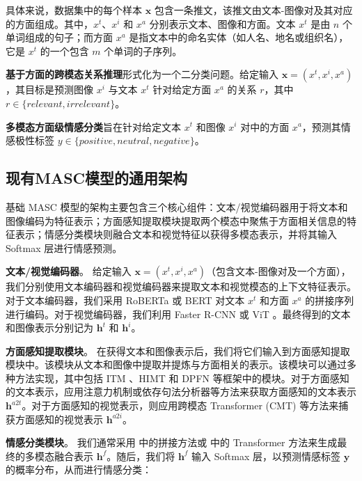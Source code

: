 具体来说，数据集中的每个样本 $\mathbf{x}$ 包含一条推文，该推文由文本-图像对及其对应的方面组成。其中，$x^t$、$x^i$ 和 $x^a$ 分别表示文本、图像和方面。文本 $x^t$ 是由 $n$ 个单词组成的句子；而方面 $x^a$ 是指文本中的命名实体（如人名、地名或组织名），它是 $x^t$ 的一个包含 $m$ 个单词的子序列。

\textbf{基于方面的跨模态关系推理}形式化为一个二分类问题。给定输入 $\mathbf{x} = (x^t, x^i, x^a)$，其目标是预测图像 $x^i$ 与文本 $x^t$ 针对给定方面 $x^a$ 的关系 $r$，其中 $r \in \{\textit{relevant}, \textit{irrelevant}\}$。

\textbf{多模态方面级情感分类}旨在针对给定文本 $x^t$ 和图像 $x^i$ 对中的方面 $x^a$，预测其情感极性标签 $y \in \{\textit{positive},  \textit{neutral},  \textit{negative}\}$。

\subsection{现有MASC模型的通用架构}
基础 MASC 模型的架构主要包含三个核心组件：文本/视觉编码器用于将文本和图像编码为特征表示；方面感知提取模块提取两个模态中聚焦于方面相关信息的特征表示；情感分类模块则融合文本和视觉特征以获得多模态表示，并将其输入 Softmax 层进行情感预测。

\textbf{文本/视觉编码器}。
给定输入 $\mathbf{x} = (x^t, x^i, x^a)$（包含文本-图像对及一个方面），我们分别使用文本编码器和视觉编码器来提取文本和视觉模态的上下文特征表示。对于文本编码器，我们采用 RoBERTa \cite{liu2019roberta} 或 BERT \cite{devlin-etal-2019-bert} 对文本 $x^t$ 和方面 $x^a$ 的拼接序列进行编码。对于视觉编码器，我们利用 Faster R-CNN \cite{ren2016faster} 或 ViT \cite{dosovitskiy2021an}。最终得到的文本和图像表示分别记为 $\mathbf{h}^t$ 和 $\mathbf{h}^i$。

\textbf{方面感知提取模块}。 在获得文本和图像表示后，我们将它们输入到方面感知提取模块中。该模块从文本和图像中提取并提炼与方面相关的表示。该模块可以通过多种方法实现，其中包括 ITM \cite{yu2022targeted}、HIMT \cite{yu2022hierarchical} 和 DPFN \cite{wang2023dual} 等框架中的模块。对于方面感知的文本表示，应用注意力机制或依存句法分析器等方法来获取方面感知的文本表示 $\mathbf{h}^{a2t}$。对于方面感知的视觉表示，则应用跨模态 Transformer (CMT) \cite{tsai2019multimodal} 等方法来捕获方面感知的视觉表示 $\mathbf{h}^{a2i}$。

\textbf{情感分类模块}。
我们通常采用 \citet{wang2023dual} 中的拼接方法或 \citet{yu2022hierarchical,yu2022targeted} 中的 Transformer 方法来生成最终的多模态融合表示 $\mathbf{h}^f$。随后，我们将 $\mathbf{h}^f$ 输入 Softmax 层，以预测情感标签 $\mathbf{y}$ 的概率分布，从而进行情感分类：


